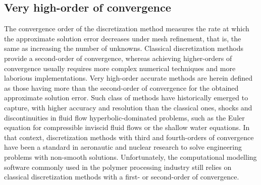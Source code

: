 \subsection{Very high-order of convergence}
\label{chap1:subsec:computational_methods_high_order_of_convergence}

The convergence order of the discretization method measures the rate at which the approximate solution error decreases under mesh refinement, that is, the same as increasing the number of unknowns.
Classical discretization methods provide a second-order of convergence, whereas achieving higher-orders of convergence usually requires more complex numerical techniques and more laborious implementations.
Very high-order accurate methods are herein defined as those having more than the second-order of convergence for the obtained approximate solution error.
Such class of methods have historically emerged to capture, with higher accuracy and resolution than the classical ones, shocks and discontinuities in fluid flow hyperbolic-dominated problems, such as the Euler equation for compressible inviscid fluid flows or the shallow water equations.
In that context, discretization methods with third and fourth-orders of convergence have been a standard in aeronautic and nuclear research to solve engineering problems with non-smooth solutions.
Unfortunately, the computational modelling software commonly used in the polymer processing industry still relies on classical discretization methods with a first- or second-order of convergence.

